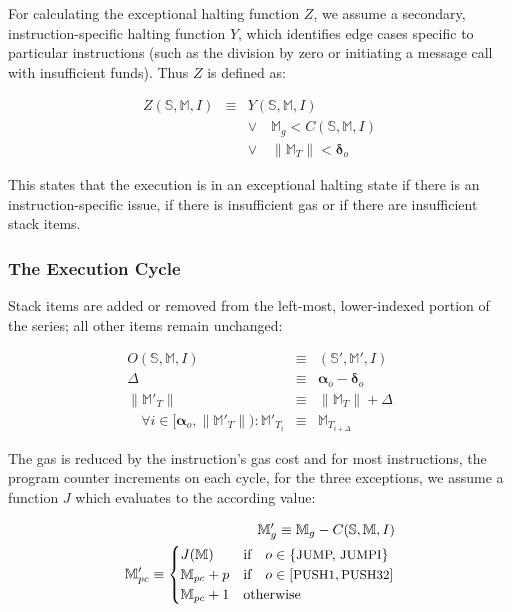 \documentclass[9pt,oneside]{amsart}
\begin{document}
\begin{multicols}{2}
For calculating the exceptional halting function $Z$, we assume a secondary, instruction-specific halting function $Y$, which identifies edge cases specific to particular instructions (such as the division by zero or initiating a message call with insufficient funds). Thus $Z$ is defined as:

\begin{equation}
\begin{array} {lll}
Z(\mathbb{S}, \mathbb{M}, I) & \equiv & Y(\mathbb{S}, \mathbb{M}, I) \\
& & \vee \quad \mathbb{M}_g < C(\mathbb{S}, \mathbb{M}, I) \\
& & \vee \quad \lVert\mathbb{M}_T\rVert < \mathbf{\delta}_o
\end{array}
\end{equation}

This states that the execution is in an exceptional halting state if there is an instruction-specific issue, if there is insufficient gas or if there are insufficient stack items.

\subsubsection{The Execution Cycle}

Stack items are added or removed from the left-most, lower-indexed portion of the series; all other items remain unchanged:

\begin{eqnarray}
O(\mathbb{S}, \mathbb{M}, I) & \equiv & (\mathbb{S}', \mathbb{M}', I) \\
\Delta & \equiv & \mathbf{\alpha}_o - \mathbf{\delta}_o \\
\lVert\mathbb{M}'_{T}\rVert & \equiv & \lVert\mathbb{M}_{T}\rVert + \Delta \\
\quad \forall i \in [\mathbf{\alpha}_o, \lVert\mathbb{M}'_T\rVert): \mathbb{M}'_{T_i} & \equiv & \mathbb{M}_{T_{i+\Delta}}
\end{eqnarray}

The gas is reduced by the instruction's gas cost and for most instructions, the program counter increments on each cycle, for the three exceptions, we assume a function $J$ which evaluates to the according value:

\begin{eqnarray}
\mathbb{M}'_{g} \equiv \mathbb{M}_{g} - C(\mathbb{S}, \mathbb{M}, I) \\
\mathbb{M}'_{pc} \equiv \begin{cases}
J(\mathbb{M}) & \text{if} \quad o \in \{ \text{\small JUMP, JUMPI} \} \\
\mathbb{M}_{pc} + p & \text{if} \quad o \in [\text{\small PUSH1}, \text{\small PUSH32}] \\
\mathbb{M}_{pc} + 1 & \text{otherwise}
\end{cases}
\end{eqnarray}


\end{multicols}
\end{document}
